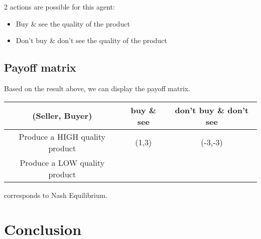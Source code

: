 \documentclass[a4paper,11pt]{article}
\begin{document}
  2 actions are possible for this agent:
  \begin{itemize}
   \item Buy \& see the quality of the product
   \item Don't buy \& don't see the quality of the product
  \end{itemize}
  
  \subsection{Payoff matrix}
  
  Based on the result above, we can display the payoff matrix.
  
  \begin{tabular}{|c|c|c|}\hline
   (Seller, Buyer) & buy \& see & don't buy \& don't see \\\hline
   Produce a HIGH quality product & (1,3) & (-3,-3) \\\hline
   Produce a LOW quality product & \color{red}{(3,0)} & \color{red}{(-1,0)} \\\hline
  \end{tabular}

  \color{red}{Red values}\color{black}{} corresponds to Nash Equilibrium.


  \section{Conclusion}
  
\end{document}

